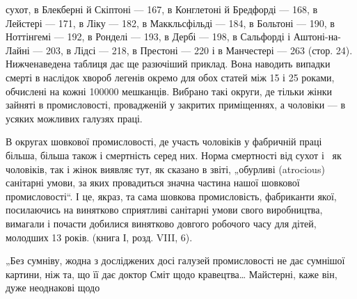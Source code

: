\parcont{}  %
сухот, в Блекберні й Скіптоні — 167, в Конглетоні й Бредфорді —
168, в Лейстері — 171, в Ліку — 182, в Маккльсфільді — 184,
в Больтоні — 190, в Ноттінгемі — 192, в Ронделі — 193, в Дербі —
198, в Сальфорді і Аштоні-на-Лайні — 203, в Лідсі — 218, в Престоні — 220 і в Манчестері — 263
(стор. 24). Нижченаведена таблиця дає ще разючіший приклад. Вона наводить випадки смерті
в наслідок хвороб легенів окремо для обох статей між 15 і
25 роками, обчислені на кожні \num{100000} мешканців. Вибрано такі
округи, де тільки жінки зайняті в промисловості, провадженій
у закритих приміщеннях, а чоловіки — в усяких можливих галузях праці.

\noindent{}В округах шовкової промисловості, де участь чоловіків
у фабричній праці більша, більша також і смертність серед них.
Норма смертності від сухот і~ як чоловіків, так і жінок
виявляє тут, як сказано в звіті, „обурливі (atrocious) санітарні
умови, за яких провадиться значна частина нашої шовкової
промисловості“. І це, якраз, та сама шовкова промисловість,
фабриканти якої, посилаючись на винятково сприятливі санітарні умови свого виробництва, вимагали і
почасти добилися
винятково довгого робочого часу для дітей, молодших 13 років.
(книга І, розд. VIII, 6).

„Без сумніву, жодна з досліджених досі галузей промисловості
не дає сумнішої картини, ніж та, що її дає доктор Сміт
щодо кравецтва\dots{} Майстерні, каже він, дуже неоднакові щодо
\parbreak{}  %
